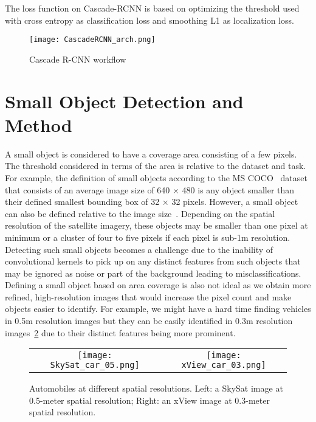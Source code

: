 \documentclass{article}
\begin{document}
The loss function on Cascade-RCNN is based on optimizing the threshold used with cross entropy as classification loss and smoothing L1 as localization loss.

\begin{figure}[!htb]
\centering
\texttt{[image: CascadeRCNN\_arch.png]}
\caption{Cascade R-CNN workflow}
\label{fig:cascadercnn}
\end{figure}

\section{Small Object Detection and Method}
\label{sec:Method}


A small object is considered to have a coverage area consisting of a few pixels. The threshold considered in terms of the area is relative to the dataset and task. For example, the definition of small objects according to the MS COCO~\cite{2014Lin} dataset that consists of an average image size of 640 $\times$ 480 is any object smaller than their defined smallest bounding box of 32 $\times$ 32 pixels. However, a small object can also be defined relative to the image size~\cite{2020Nguyen}. Depending on the spatial resolution of the satellite imagery, these objects may be smaller than one pixel at minimum or a cluster of four to five pixels if each pixel is sub-1m resolution. Detecting such small objects becomes a challenge due to the inability of convolutional kernels to pick up on any distinct features from such objects that may be ignored as noise or part of the background leading to misclassifications. Defining a small object based on area coverage is also not ideal as we obtain more refined, high-resolution images that would increase the pixel count and make objects easier to identify. For example, we might have a hard time finding vehicles in 0.5m resolution images but they can be easily identified in 0.3m resolution images~\cref{fig:smallObject} due to their distinct features being more prominent. 
\begin{figure}[!htb]
\centering
\begin{tabular}{@{}cc}
\texttt{[image: SkySat\_car\_05.png]}&
\texttt{[image: xView\_car\_03.png]}
\end{tabular}
\caption{Automobiles at different spatial resolutions. Left: a SkySat image at 0.5-meter spatial resolution; Right: an xView image at 0.3-meter spatial resolution. 
\label{fig:smallObject}}
\end{figure}
\end{document}
